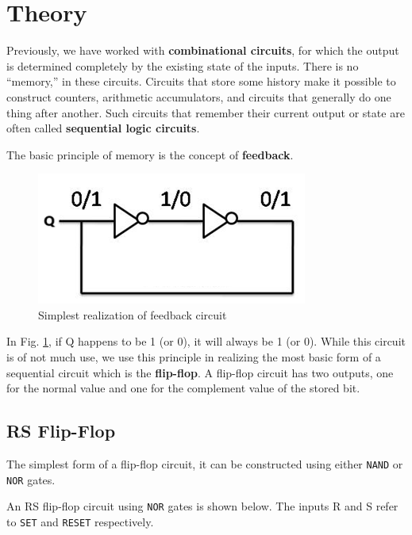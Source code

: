 \section{Theory}

Previously, we have worked with \textbf{combinational circuits}, for which the output
is determined completely by the existing state of the inputs. There is no “memory,” in these circuits. Circuits that store some history make it possible to construct counters, arithmetic accumulators, and circuits that generally do one thing after another. Such circuits that remember their current output or state are often called \textbf{sequential logic circuits}.

The basic principle of memory is the concept of \textbf{feedback}.

\begin{figure}[H]
    \centering
    \includegraphics[width=0.50\columnwidth]{images/feed.png}
    \caption{Simplest realization of feedback circuit}
    \label{feedback}
\end{figure}

In Fig. \ref{feedback}, if Q happens to be 1 (or 0), it will always be 1 (or 0). While this circuit is of not much use, we use this principle in realizing the most basic form of a sequential circuit which is the \textbf{flip-flop}. A flip-flop circuit has two outputs, one for the normal value and one for the complement value of the stored bit.

\subsection*{RS Flip-Flop}
The simplest form of a flip-flop circuit, it can be constructed using either \verb|NAND| or \verb|NOR| gates.

An RS flip-flop circuit using \verb|NOR| gates is shown below. The inputs R and S refer to \verb|SET| and \verb|RESET| respectively.

